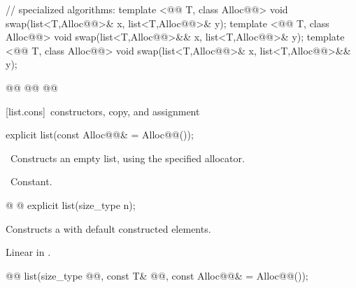 \documentclass[american,twoside]{book}
\begin{document}
\begin{codeblock}
{  // specialized algorithms:
  template <@@ T, class Alloc@@>
    void swap(list<T,Alloc@@>& x, list<T,Alloc@@>& y);
  template <@@ T, class Alloc@@>
    void swap(list<T,Alloc@@>&& x, list<T,Alloc@@>& y);
  template <@@ T, class Alloc@@>
    void swap(list<T,Alloc@@>& x, list<T,Alloc@@>&& y);

  @@
    @@
      @@
}
\end{codeblock}

[list.cons]{\ constructors, copy, and assignment}

\begin{itemdecl}
explicit list(const Alloc@@& = Alloc@@());
\end{itemdecl}

\begin{itemdescr}
\pnum
\effects\ 
Constructs an empty list, using the specified allocator.

\pnum
\complexity\ 
Constant.
\end{itemdescr}

\begin{itemdecl}
@ @ explicit list(size_type n);
\end{itemdecl}

\begin{itemdescr}
\pnum
\effects Constructs a  with
 default constructed elements.

\pnum
{}

\pnum
\complexity
Linear in
.
\end{itemdescr}

\begin{itemdecl}
@@
  list(size_type @@, const T& @@,
                const Alloc@@& = Alloc@\removedConcepts{ator}@());
\end{itemdecl}
\end{document}
